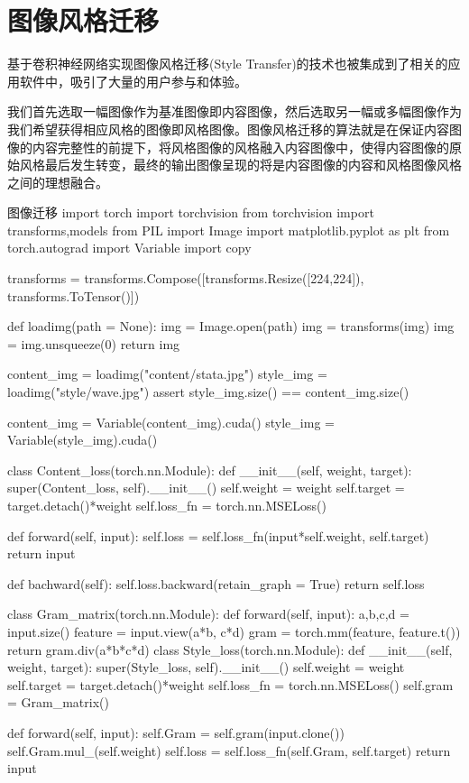 \documentclass[openbib]{article}
\begin{document}
\section{图像风格迁移}
基于卷积神经网络实现图像风格迁移(Style Transfer)的技术也被集成到了相关的应用软件中，吸引了大量的用户参与和体验。

我们首先选取一幅图像作为基准图像即内容图像，然后选取另一幅或多幅图像作为我们希望获得相应风格的图像即风格图像。图像风格迁移的算法就是在保证内容图像的内容完整性的前提下，将风格图像的风格融入内容图像中，使得内容图像的原始风格最后发生转变，最终的输出图像呈现的将是内容图像的内容和风格图像风格之间的理想融合。

\begin{Python}{图像迁移}
import torch
import torchvision
from torchvision import transforms,models
from PIL import Image
import matplotlib.pyplot as plt
from torch.autograd import Variable
import copy

transforms = transforms.Compose([transforms.Resize([224,224]),
								transforms.ToTensor()])

def loadimg(path = None):
	img = Image.open(path)
	img = transforms(img)
	img = img.unsqueeze(0)
	return img

content_img = loadimg("content/stata.jpg")
style_img = loadimg("style/wave.jpg")
assert style_img.size() == content_img.size()

content_img = Variable(content_img).cuda()
style_img = Variable(style_img).cuda()

class Content_loss(torch.nn.Module):
	def __init__(self, weight, target):
		super(Content_loss, self).__init__()
		self.weight = weight
		self.target = target.detach()*weight
		self.loss_fn = torch.nn.MSELoss()

	def forward(self, input):
		self.loss = self.loss_fn(input*self.weight, self.target)
		return input

	def bachward(self):
		self.loss.backward(retain_graph = True)
		return self.loss

class Gram_matrix(torch.nn.Module):
	def forward(self, input):
		a,b,c,d = input.size()
		feature = input.view(a*b, c*d)
		gram = torch.mm(feature, feature.t())
		return gram.div(a*b*c*d)
class Style_loss(torch.nn.Module):
	def __init__(self, weight, target):
		super(Style_loss, self).__init__()
		self.weight = weight
		self.target = target.detach()*weight
		self.loss_fn = torch.nn.MSELoss()
		self.gram = Gram_matrix()

	def forward(self, input):
		self.Gram = self.gram(input.clone())
		self.Gram.mul_(self.weight)
		self.loss = self.loss_fn(self.Gram, self.target)
		return input


\end{Python}
\end{document}
